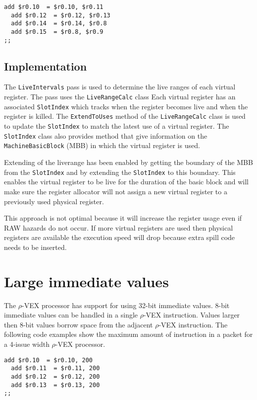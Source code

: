 \begin{lstlisting}[language=rvex]
  add $r0.10  = $r0.10, $r0.11
  add $r0.12  = $r0.12, $r0.13
  add $r0.14  = $r0.14, $r0.8
  add $r0.15  = $r0.8, $r0.9
;;
\end{lstlisting}

\subsection{Implementation} %
\label{sub:implementation}
The \texttt{LiveIntervals} pass is used to determine the live ranges of each virtual register. The pass uses the \texttt{LiveRangeCalc} class
Each virtual register has an associated \texttt{SlotIndex} which tracks when the register becomes live and when the register is killed. The \texttt{ExtendToUses} method of the \texttt{LiveRangeCalc} class is used to update the \texttt{SlotIndex} to match the latest use of a virtual register. The \texttt{SlotIndex} class also provides method that give information on the \texttt{MachineBasicBlock} (MBB) in which the virtual register is used.

Extending of the liverange has been enabled by getting the boundary of the MBB from the \texttt{SlotIndex} and by extending the \texttt{SlotIndex} to this boundary. This enables the virtual register to be live for the duration of the basic block and will make sure the register allocator will not assign a new virtual register to a previously used physical register.

This approach is not optimal because it will increase the register usage even if RAW hazards do not occur. If more virtual registers are used then physical registers are available the execution speed will drop because extra spill code needs to be inserted.

\section{Large immediate values}
The $\rho$-VEX processor has support for using 32-bit immediate values. 8-bit immediate values can be handled in a single $\rho$-VEX instruction. Values larger then 8-bit values borrow space from the adjacent $\rho$-VEX instruction. The following code examples show the maximum amount of instruction in a packet for a 4-issue width $\rho$-VEX processor.

\begin{lstlisting}[language=rvex]
  add $r0.10  = $r0.10, 200
  add $r0.11  = $r0.11, 200
  add $r0.12  = $r0.12, 200
  add $r0.13  = $r0.13, 200
;;
\end{lstlisting}

